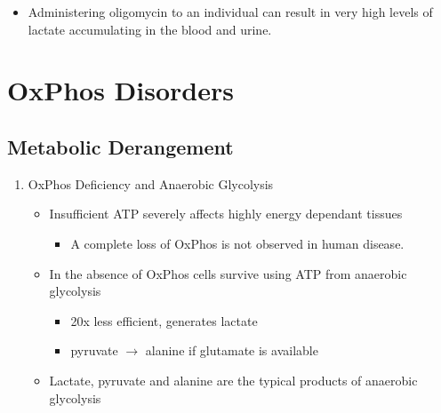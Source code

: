 \documentclass{scrartcl}
\begin{document}
\begin{enumerate}
\begin{itemize}
\item Administering oligomycin to an individual can result in very high
levels of lactate accumulating in the blood and urine.
\end{itemize}
\end{enumerate}
\section{OxPhos Disorders}
\label{sec:orge726806}
\subsection{Metabolic Derangement}
\label{sec:orgb9ed5ba}
\begin{enumerate}
\item OxPhos Deficiency and Anaerobic Glycolysis
\label{sec:org59fa82c}
\begin{itemize}
\item Insufficient ATP severely affects highly energy dependant tissues
\begin{itemize}
\item A complete loss of OxPhos is not observed in human disease.
\end{itemize}
\item In the absence of OxPhos cells survive using ATP from anaerobic glycolysis
\begin{itemize}
\item 20x less efficient, generates lactate
\item pyruvate \(\to\) alanine if glutamate is available
\end{itemize}
\item Lactate, pyruvate and alanine are the typical products of anaerobic glycolysis
\end{itemize}


\end{enumerate}
\end{document}
